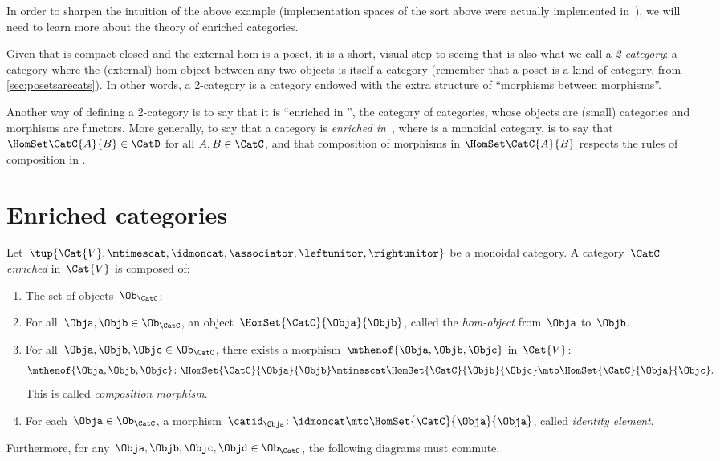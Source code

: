 In order to sharpen the intuition of the above example (implementation spaces of the sort above were actually implemented in~\cite{censi}), we will need to learn more about the theory of enriched categories.

Given that \DP is compact closed and the external hom is a poset, it is a short, visual step to seeing that \DP is also what we call a \emph{2-category}: a category where the (external) hom-object between any two objects is itself a category (remember that a poset is a kind of category, from \cref{sec:posetsarecats}).
In other words, a 2-category is a category endowed with the extra structure of ``morphisms between morphisms''.

Another way of defining a 2-category is to say that it is ``enriched in \Category'', the category of categories, whose objects are (small) categories and morphisms are functors.
More generally, to say that a category \CatC is \emph{enriched in~\CatD}, where \CatD is a monoidal category, is to say that $\HomSet\CatC{A}{B} \in \CatD$ for all $A,B \in \CatC$, and that composition of morphisms in $\HomSet\CatC{A}{B}$ respects the rules of composition in \CatD.

\section{Enriched categories}
\label{sec:enrichment-enriched-categories}

\begin{ctdefinition}
	\label{def:enriched_cat}
	Let~$\tup{\Cat{V},\mtimescat, \idmoncat, \associator, \leftunitor,\rightunitor}$ be a monoidal category.
	A category~$\CatC$ \emph{enriched} in~$\Cat{V}$ is composed of:
	\begin{enumerate}
		\item The set of objects~$\Ob_\CatC$;
		\item For all~$\Obja,\Objb\in \Ob_\CatC$, an object~$\HomSet{\CatC}{\Obja}{\Objb}$, called the \emph{hom-object} from~$\Obja$ to~$\Objb$.
		\item For all~$\Obja, \Objb, \Objc\in \Ob_\CatC$, there exists a morphism~$\mthenof{\Obja,\Objb,\Objc}$ in~$\Cat{V}$:
		      \begin{equation}
			      \mthenof{\Obja,\Objb,\Objc}\colon \HomSet{\CatC}{\Obja}{\Objb}\mtimescat \HomSet{\CatC}{\Objb}{\Objc}\mto \HomSet{\CatC}{\Obja}{\Objc}.
		      \end{equation}
		      This is called \emph{composition morphism}.
		\item For each~$\Obja\in \Ob_\CatC$, a morphism~$\catid_\Obja\colon \idmoncat \mto \HomSet{\CatC}{\Obja}{\Obja}$, called \emph{identity element}.
	\end{enumerate}
	Furthermore, for any~$\Obja,\Objb,\Objc,\Objd\in \Ob_\CatC$, the following diagrams must commute.
\end{ctdefinition}

